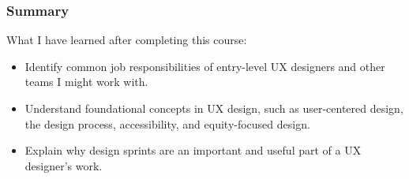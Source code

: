 \subsubsection{Summary}
\begin{flushleft}
	What I have learned after completing this course:
	\begin{itemize}
		\item Identify common job responsibilities of entry-level UX designers and other teams I might work with.
		\item Understand foundational concepts in UX design, such as user-centered design, the design process, accessibility, and equity-focused design.
		\item Explain why design sprints are an important and useful part of a UX designer's work.
	\end{itemize}
\end{flushleft}

